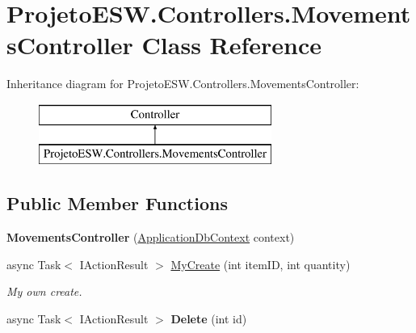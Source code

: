 \hypertarget{class_projeto_e_s_w_1_1_controllers_1_1_movements_controller}{}\section{Projeto\+E\+S\+W.\+Controllers.\+Movements\+Controller Class Reference}
\label{class_projeto_e_s_w_1_1_controllers_1_1_movements_controller}
Inheritance diagram for Projeto\+E\+S\+W.\+Controllers.\+Movements\+Controller\+:\begin{figure}[H]
\begin{center}
\leavevmode
\includegraphics[height=2.000000cm]{class_projeto_e_s_w_1_1_controllers_1_1_movements_controller}
\end{center}
\end{figure}
\subsection*{Public Member Functions}
\begin{DoxyCompactItemize}
\item 
\mbox{\label{class_projeto_e_s_w_1_1_controllers_1_1_movements_controller_a449c96ec16af7c308e9f2d7ed2b76b09}} 
{\bfseries Movements\+Controller} (\mbox{\hyperlink{class_projeto_e_s_w_1_1_data_1_1_application_db_context}{Application\+Db\+Context}} context)
\item 
async Task$<$ I\+Action\+Result $>$ \mbox{\hyperlink{class_projeto_e_s_w_1_1_controllers_1_1_movements_controller_aec0f7583a2b49b2827e0c0f3caac18d9}{My\+Create}} (int item\+ID, int quantity)
\begin{DoxyCompactList}\small\item\em My own create.\end{DoxyCompactList}\item 
\mbox{\label{class_projeto_e_s_w_1_1_controllers_1_1_movements_controller_a6154b7431a541aa1f1a31563f3c81d2c}} 
async Task$<$ I\+Action\+Result $>$ {\bfseries Delete} (int id)
\end{DoxyCompactItemize}
